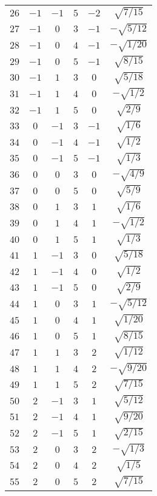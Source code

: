 \begin{table}
\begin{center}
\begin{tabular}{|c|c|c|c|c|c|}
$26$ & $-1$ & $-1$ & $5$ & $-2$ & $\sqrt{7/15}$ \\ 
$27$ & $-1$ & $0$ & $3$ & $-1$ & $-\sqrt{5/12}$ \\ 
$28$ & $-1$ & $0$ & $4$ & $-1$ & $-\sqrt{1/20}$ \\ 
$29$ & $-1$ & $0$ & $5$ & $-1$ & $\sqrt{8/15}$ \\ 
$30$ & $-1$ & $1$ & $3$ & $0$ & $\sqrt{5/18}$ \\ 
$31$ & $-1$ & $1$ & $4$ & $0$ & $-\sqrt{1/2}$ \\ 
$32$ & $-1$ & $1$ & $5$ & $0$ & $\sqrt{2/9}$ \\ 
$33$ & $0$ & $-1$ & $3$ & $-1$ & $\sqrt{1/6}$ \\ 
$34$ & $0$ & $-1$ & $4$ & $-1$ & $\sqrt{1/2}$ \\ 
$35$ & $0$ & $-1$ & $5$ & $-1$ & $\sqrt{1/3}$ \\ 
$36$ & $0$ & $0$ & $3$ & $0$ & $-\sqrt{4/9}$ \\ 
$37$ & $0$ & $0$ & $5$ & $0$ & $\sqrt{5/9}$ \\ 
$38$ & $0$ & $1$ & $3$ & $1$ & $\sqrt{1/6}$ \\ 
$39$ & $0$ & $1$ & $4$ & $1$ & $-\sqrt{1/2}$ \\ 
$40$ & $0$ & $1$ & $5$ & $1$ & $\sqrt{1/3}$ \\ 
$41$ & $1$ & $-1$ & $3$ & $0$ & $\sqrt{5/18}$ \\ 
$42$ & $1$ & $-1$ & $4$ & $0$ & $\sqrt{1/2}$ \\ 
$43$ & $1$ & $-1$ & $5$ & $0$ & $\sqrt{2/9}$ \\ 
$44$ & $1$ & $0$ & $3$ & $1$ & $-\sqrt{5/12}$ \\ 
$45$ & $1$ & $0$ & $4$ & $1$ & $\sqrt{1/20}$ \\ 
$46$ & $1$ & $0$ & $5$ & $1$ & $\sqrt{8/15}$ \\ 
$47$ & $1$ & $1$ & $3$ & $2$ & $\sqrt{1/12}$ \\ 
$48$ & $1$ & $1$ & $4$ & $2$ & $-\sqrt{9/20}$ \\ 
$49$ & $1$ & $1$ & $5$ & $2$ & $\sqrt{7/15}$ \\ 
$50$ & $2$ & $-1$ & $3$ & $1$ & $\sqrt{5/12}$ \\ 
$51$ & $2$ & $-1$ & $4$ & $1$ & $\sqrt{9/20}$ \\ 
$52$ & $2$ & $-1$ & $5$ & $1$ & $\sqrt{2/15}$ \\ 
$53$ & $2$ & $0$ & $3$ & $2$ & $-\sqrt{1/3}$ \\ 
$54$ & $2$ & $0$ & $4$ & $2$ & $\sqrt{1/5}$ \\ 
$55$ & $2$ & $0$ & $5$ & $2$ & $\sqrt{7/15}$ \\ 

\end{tabular}
\end{center}
\end{table}
